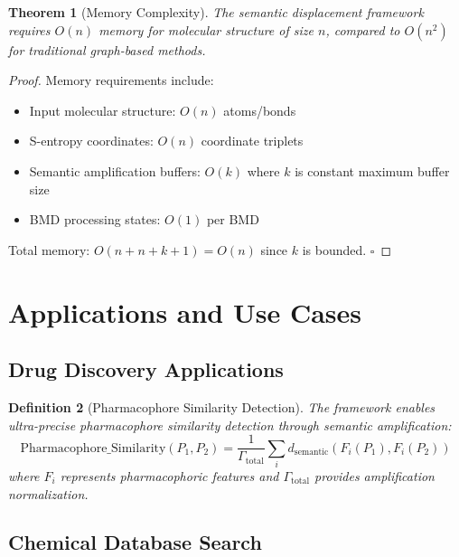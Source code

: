 \documentclass[12pt,a4paper]{article}
\newtheorem{theorem}{Theorem}[section]
\newtheorem{definition}[theorem]{Definition}
\begin{document}
\begin{theorem}[Memory Complexity]
The semantic displacement framework requires $O(n)$ memory for molecular structure of size $n$, compared to $O(n^2)$ for traditional graph-based methods.
\end{theorem}

\begin{proof}
Memory requirements include:
\begin{itemize}
\item Input molecular structure: $O(n)$ atoms/bonds
\item S-entropy coordinates: $O(n)$ coordinate triplets
\item Semantic amplification buffers: $O(k)$ where $k$ is constant maximum buffer size
\item BMD processing states: $O(1)$ per BMD
\end{itemize}
Total memory: $O(n + n + k + 1) = O(n)$ since $k$ is bounded. $\square$
\end{proof}

\section{Applications and Use Cases}

\subsection{Drug Discovery Applications}

\begin{definition}[Pharmacophore Similarity Detection]
The framework enables ultra-precise pharmacophore similarity detection through semantic amplification:
\begin{equation}
\text{Pharmacophore\_Similarity}(P_1, P_2) = \frac{1}{\Gamma_{\text{total}}} \sum_{i} d_{\text{semantic}}(F_i(P_1), F_i(P_2))
\end{equation}
where $F_i$ represents pharmacophoric features and $\Gamma_{\text{total}}$ provides amplification normalization.
\end{definition}

\subsection{Chemical Database Search}
\end{document}
